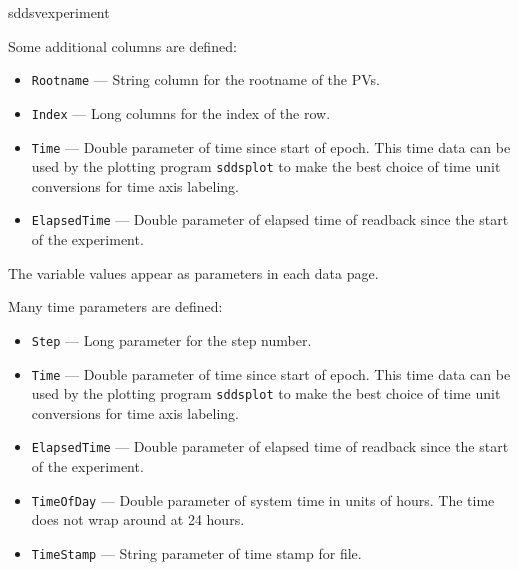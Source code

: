 \begin{sddsprog}{sddsvexperiment}
\begin{itemize}
Some additional columns are defined:
  \begin{itemize}
    \item {\verb+Rootname+} --- String column for the rootname of the PVs.
    \item {\verb+Index+} --- Long columns for the index of the row.
    \item {\tt Time} --- Double parameter of time since start of epoch. This time data can be used by
        the plotting program {\verb+sddsplot+} to make the best choice of time unit conversions
        for time axis labeling.
    \item {\tt ElapsedTime} --- Double parameter of elapsed time of readback since the start of the experiment.
  \end{itemize}

The variable values appear as parameters in each data page.

Many time parameters are defined:
  \begin{itemize}
    \item {\verb+Step+} --- Long parameter for the step number.
    \item {\tt Time} --- Double parameter of time since start of epoch. This time data can be used by
        the plotting program {\verb+sddsplot+} to make the best choice of time unit conversions
        for time axis labeling.
    \item {\tt ElapsedTime} --- Double parameter of elapsed time of readback since the start of the experiment.
    \item {\tt TimeOfDay} --- Double parameter of system time in units of hours.
                The time does not wrap around at 24 hours.
    \item {\tt TimeStamp} --- String parameter of time stamp for file.
  \end{itemize}

\end{itemize}


\end{sddsprog}
